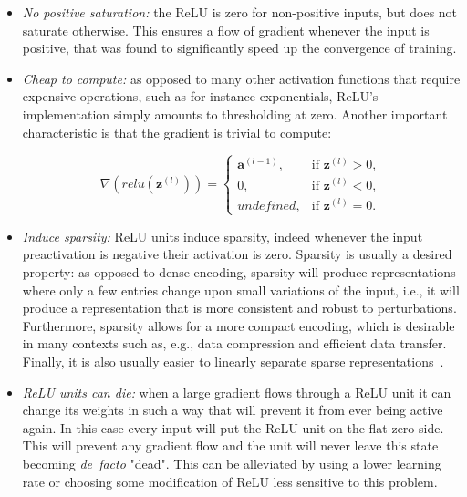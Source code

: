 \begin{itemize}
    \item \emph{No positive saturation:} the ReLU is zero for non-positive
        inputs, but does not saturate otherwise. This ensures a flow of
        gradient whenever the input is positive, that was found to
        significantly speed up the convergence of training.
    \item \emph{Cheap to compute:} as opposed to many other activation
        functions that require expensive operations, such as for instance
        exponentials, ReLU's implementation simply amounts to thresholding at
        zero. Another important characteristic is that the gradient is trivial
        to compute:

        \begin{equation}\label{eq:relu_derivative}
            \nabla (relu(\mathbf{z}^{(l)})) =
                \begin{cases}
                    \mathbf{a}^{(l-1)},  & \text{if } \mathbf{z}^{(l)} > 0 ,\\
                    0,          & \text{if } \mathbf{z}^{(l)} < 0 ,\\
                    undefined,  & \text{if } \mathbf{z}^{(l)} = 0.
                \end{cases}
        \end{equation}

    \item \emph{Induce sparsity:} ReLU units induce sparsity, indeed whenever
        the input preactivation is negative their activation is zero. Sparsity
        is usually a desired property: as opposed to dense encoding, sparsity
        will produce representations where only a few entries change upon small
        variations of the input, i.e., it will produce a representation that is
        more consistent and robust to perturbations. Furthermore, sparsity
        allows for a more compact encoding, which is desirable in many contexts
        such as, e.g., data compression and efficient data transfer.  Finally,
        it is also usually easier to linearly separate sparse
        representations~\citep{Glorot+al-AI-2011-small}.
    \item \emph{ReLU units can die:} when a large gradient flows through a ReLU
        unit it can change its weights in such a way that will prevent it from
        ever being active again. In this case every input will put the ReLU
        unit on the flat zero side. This will prevent any gradient flow and the
        unit will never leave this state becoming \emph{de~facto} "dead". This
        can be alleviated by using a lower learning rate or choosing some
        modification of ReLU less sensitive to this problem.
\end{itemize}

